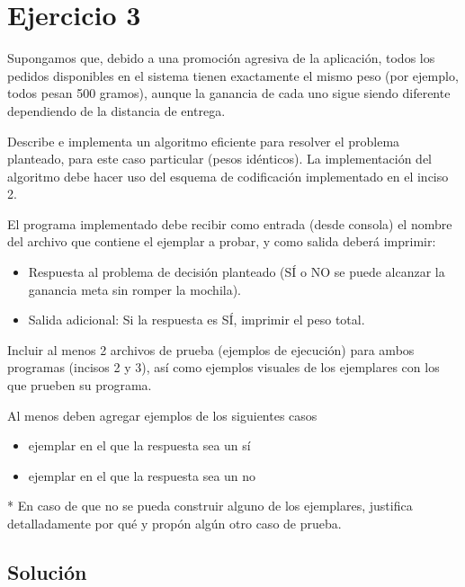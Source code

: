 \section{Ejercicio 3}

\begin{tcolorbox}[enunciado]
Supongamos que, debido a una promoción agresiva de la aplicación, todos los pedidos disponibles en el sistema tienen exactamente el mismo peso (por ejemplo, todos pesan 500 gramos), aunque la ganancia de cada uno sigue siendo diferente dependiendo de la distancia de entrega.

Describe e implementa un algoritmo eficiente para resolver el problema planteado, para este caso particular (pesos idénticos). La implementación del algoritmo debe hacer uso del esquema de codificación implementado en el inciso 2.

El programa implementado debe recibir como entrada (desde consola) el nombre del archivo que contiene el ejemplar a probar, y como salida deberá imprimir:
\begin{itemize}[leftmargin=*]
    \item Respuesta al problema de decisión planteado (SÍ o NO se puede alcanzar la ganancia meta sin romper la mochila).
    \item Salida adicional: Si la respuesta es SÍ, imprimir el peso total.
\end{itemize}

Incluir al menos 2 archivos de prueba (ejemplos de ejecución) para ambos programas (incisos 2 y 3), así como ejemplos visuales de los ejemplares con los que prueben su programa.

Al menos deben agregar ejemplos de los siguientes casos
\begin{itemize}[leftmargin=*]
    \item ejemplar en el que la respuesta sea un sí
    \item ejemplar en el que la respuesta sea un no
\end{itemize}

* En caso de que no se pueda construir alguno de los ejemplares, justifica detalladamente por qué y propón algún otro caso de prueba.
\end{tcolorbox}

\subsection{Solución}

